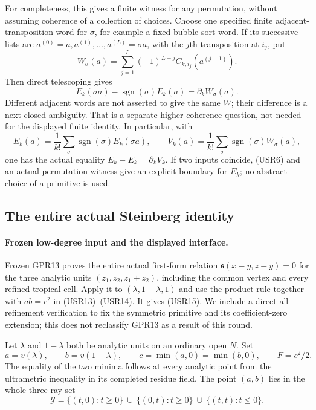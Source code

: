 For completeness, this gives a finite witness for any permutation,
without assuming coherence of a collection of choices.  Choose one
specified finite adjacent-transposition word for $\sigma$, for
example a fixed bubble-sort word.  If its successive lists are
$a^{(0)}=a,a^{(1)},\ldots,a^{(L)}=\sigma a$, with the $j$th
transposition at $i_j$, put
\[
 W_\sigma(a)=\sum_{j=1}^L(-1)^{L-j}C_{k,i_j}(a^{(j-1)}).
 \tag{USR10}
\]
Then direct telescoping gives
\[
 E_k(\sigma a)-\operatorname{sgn}(\sigma)E_k(a)
                              =\partial_k W_\sigma(a).
 \tag{USR11}
\]
Different adjacent words are not asserted to give the same $W$;
their difference is a next closed ambiguity.  That is a separate
higher-coherence question, not needed for the displayed finite
identity.  In particular, with
\[
 \overline E_k(a)=\frac1{k!}\sum_\sigma
                         \operatorname{sgn}(\sigma)E_k(\sigma a),
 \qquad
 V_k(a)=\frac1{k!}\sum_\sigma
                         \operatorname{sgn}(\sigma)W_\sigma(a),
 \tag{USR12}
\]
one has the actual equality $\overline E_k-E_k=\partial_k V_k$.
If two inputs coincide, (USR6) and an actual permutation witness
give an explicit boundary for $E_k$; no abstract choice of a
primitive is used.

\subsection{The entire actual Steinberg identity}

\paragraph{Frozen low-degree input and the displayed interface.}
Frozen GPR13 proves the entire actual first-form relation
$\mathfrak s(x-y,z-y)=0$ for the three analytic units
$(z_1,z_2,z_1+z_2)$, including the common vertex and every refined
tropical cell.  Apply it to $(\lambda,1-\lambda,1)$ and use the
product rule together with $ab=c^2$ in (USR13)--(USR14).
It gives (USR15).  We include a direct all-refinement verification
to fix the symmetric primitive and its coefficient-zero extension;
this does not reclassify GPR13 as a result of this round.

Let $\lambda$ and $1-\lambda$ both be analytic units on an ordinary
open $N$.  Set
\[
 a=v(\lambda),\qquad b=v(1-\lambda),\qquad
                 c=\min(a,0)=\min(b,0),\qquad F=c^2/2.
 \tag{USR13}
\]
The equality of the two minima follows at every analytic point
from the ultrametric inequality in its completed residue field.
The point $(a,b)$ lies in the whole three-ray set
\[
 \mathcal Y=\{(t,0):t\ge0\}\ \cup\
            \{(0,t):t\ge0\}\ \cup\
            \{(t,t):t\le0\}.
 \tag{USR14}
\]

